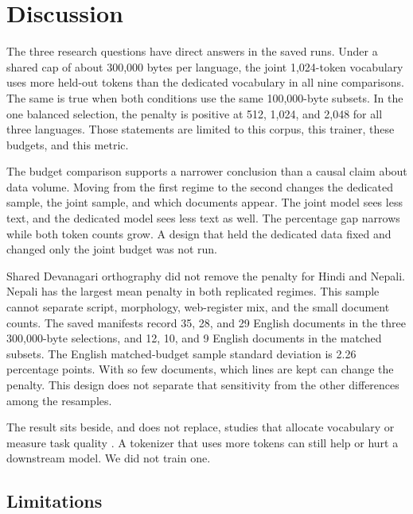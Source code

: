 \documentclass[10pt,twocolumn]{article}
\begin{document}
\section{Discussion}

The three research questions have direct answers in the saved runs.
Under a shared cap of about 300{,}000 bytes per language, the joint 1{,}024-token vocabulary uses more held-out tokens than the dedicated vocabulary in all nine comparisons.
The same is true when both conditions use the same 100{,}000-byte subsets.
In the one balanced selection, the penalty is positive at 512, 1{,}024, and 2{,}048 for all three languages.
Those statements are limited to this corpus, this trainer, these budgets, and this metric.

The budget comparison supports a narrower conclusion than a causal claim about data volume.
Moving from the first regime to the second changes the dedicated sample, the joint sample, and which documents appear.
The joint model sees less text, and the dedicated model sees less text as well.
The percentage gap narrows while both token counts grow.
A design that held the dedicated data fixed and changed only the joint budget was not run.

Shared Devanagari orthography did not remove the penalty for Hindi and Nepali.
Nepali has the largest mean penalty in both replicated regimes.
This sample cannot separate script, morphology, web-register mix, and the small document counts.
The saved manifests record 35, 28, and 29 English documents in the three 300{,}000-byte selections, and 12, 10, and 9 English documents in the matched subsets.
The English matched-budget sample standard deviation is 2.26 percentage points.
With so few documents, which lines are kept can change the penalty.
This design does not separate that sensitivity from the other differences among the resamples.

The result sits beside, and does not replace, studies that allocate vocabulary or measure task quality \citep{chung-etal-2020-improving,liang-etal-2023-xlm,brahma-etal-2026-multilingual,ali-etal-2024-tokenizer}.
A tokenizer that uses more tokens can still help or hurt a downstream model.
We did not train one.

\FloatBarrier
\subsection{Limitations}
\end{document}
